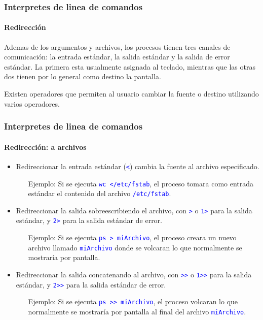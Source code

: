 \documentclass[11pt,a4paper,spanish]{beamer}
\newcommand{\cw}[1]{\mbox{\texttt{\textcolor{blue}{#1}}}}
\begin{document}
\begin{frame}

    \frametitle{Interpretes de linea de comandos}
    \framesubtitle{Redirección}

    Ademas de los argumentos y archivos, los procesos tienen tres canales de
    comunicación: la entrada estándar, la salida estándar y la salida de error
    estándar. La primera esta usualmente asignada al teclado, mientras que las
    otras dos tienen por lo general como destino la pantalla.

    Existen operadores que permiten al usuario cambiar la fuente o destino
    utilizando varios operadores.

\end{frame}

\begin{frame}

    \frametitle{Interpretes de linea de comandos}
    \framesubtitle{Redirección: a archivos}

    \begin{itemize}
        \item Redireccionar la entrada estándar (\cw{<}) cambia la
            fuente al archivo especificado.
        \begin{itemize}
            \item[Ejemplo:] Si se ejecuta \cw{wc </etc/fstab}, el
                proceso tomara como entrada estándar el contenido del archivo
                \cw{/etc/fstab}.
        \end{itemize}\pause
        \item Redireccionar la salida sobreescribiendo el archivo, con
            \cw{>} o \cw{1>} para la salida estándar, y
            \cw{2>} para la salida estándar de error.
        \begin{itemize}
            \item[Ejemplo:] Si se ejecuta \cw{ps > miArchivo}, el
                proceso creara un nuevo archivo llamado \cw{miArchivo}
                donde se volcaran lo que normalmente se mostraría por
                pantalla.
        \end{itemize}\pause
        \item Redireccionar la salida concatenando al archivo, con
            \cw{>>} o \cw{1>>} para la salida estándar, y
            \cw{2>>} para la salida estándar de error.
        \begin{itemize}
            \item[Ejemplo:] Si se ejecuta \cw{ps >> miArchivo}, el
                proceso volcaran lo que normalmente se mostraría por
                pantalla al final del archivo \cw{miArchivo}.
        \end{itemize}
    \end{itemize}

\end{frame}
\end{document}
